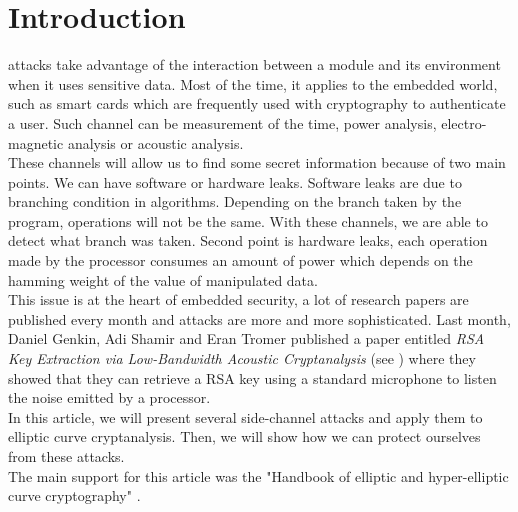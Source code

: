 \documentclass[journal]{IEEEtran}
\begin{document}
\section{Introduction}

 attacks take advantage of the interaction between a module and its environment when it uses sensitive data. Most of the time, it applies to the embedded world, such as smart cards which are frequently used with cryptography to authenticate a user. Such channel can be measurement of the time, power analysis, electro-magnetic analysis or acoustic analysis.\\

These channels will allow us to find some secret information because of two main points. We can have software or hardware leaks. Software leaks are due to branching condition in algorithms. Depending on the branch taken by the program, operations will not be the same. With these channels, we are able to detect what branch was taken. Second point is hardware leaks, each operation made by the processor consumes an amount of power which depends on the hamming weight of the value of manipulated data.\\

This issue is at the heart of embedded security, a lot of research papers are published every month and attacks are more and more sophisticated. Last month, Daniel Genkin, Adi Shamir and Eran Tromer published a paper entitled 
{\it RSA Key Extraction via Low-Bandwidth Acoustic Cryptanalysis} (see \cite{genkin2013rsa}) where they showed that they can retrieve a RSA key using a standard microphone to listen the noise emitted by a processor.\\

In this article, we will present several side-channel attacks and apply them to elliptic curve cryptanalysis. Then, we will show how we can protect ourselves from these attacks.\\

The main support for this article was the "Handbook of elliptic and hyper-elliptic curve cryptography" \cite{cohen2010handbook}.



\end{document}

